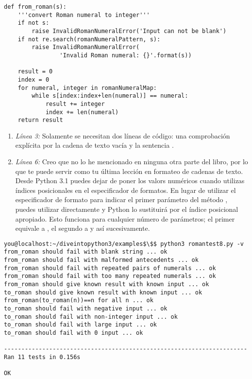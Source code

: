 \noindent\begin{minipage}{\textwidth}
\begin{lstlisting}[mathescape=True]
def from_roman(s):
    '''convert Roman numeral to integer'''
    if not s:
        raise InvalidRomanNumeralError('Input can not be blank')
    if not re.search(romanNumeralPattern, s):
        raise InvalidRomanNumeralError(
                'Invalid Roman numeral: {}'.format(s))

    result = 0
    index = 0
    for numeral, integer in romanNumeralMap:
        while s[index:index+len(numeral)] == numeral:
            result += integer
            index += len(numeral)
    return result
\end{lstlisting}
\end{minipage}

\begin{enumerate}

\item \emph{Línea 3:} Solamente se necesitan dos líneas de código: una comprobación explícita por la cadena de texto vacía y la sentencia .

\item \emph{Línea 6:} Creo que no lo he mencionado en ninguna otra parte del libro, por lo que te puede servir como tu última lección en formateo de cadenas de texto. Desde Python 3.1 puedes dejar de poner los valors numéricos cuando utilizas índices posicionales en el especificador de formatos. En lugar de utilizar el especificador de formato  para indicar el primer parámetro del método , puedes utilizar directamente \codigo{\{\}} y Python lo sustituirá por el índice posicional apropiado. Esto funciona para cualquier número de parámetros; el primer \codigo{\{\}} equivale a , el segundo \codigo{\{\}} a  y así sucesivamente.

\end{enumerate}

\noindent\begin{minipage}{\textwidth}
\begin{lstlisting}[mathescape=True]
you@localhost:~/diveintopython3/examples$\$$ python3 romantest8.py -v
from_roman should fail with blank string ... ok
from_roman should fail with malformed antecedents ... ok
from_roman should fail with repeated pairs of numerals ... ok
from_roman should fail with too many repeated numerals ... ok
from_roman should give known result with known input ... ok
to_roman should give known result with known input ... ok
from_roman(to_roman(n))==n for all n ... ok
to_roman should fail with negative input ... ok
to_roman should fail with non-integer input ... ok
to_roman should fail with large input ... ok
to_roman should fail with 0 input ... ok

----------------------------------------------------------------------
Ran 11 tests in 0.156s

OK
\end{lstlisting}
\end{minipage}

